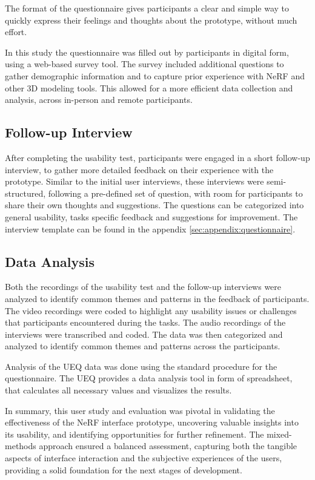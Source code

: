 The format of the questionnaire gives participants a clear and simple way to  quickly express their feelings and thoughts about the prototype, without much effort.

In this study the questionnaire was filled out by participants in digital form, using a web-based survey tool. %
The survey included additional questions to gather demographic information and to capture prior experience with NeRF and other 3D modeling tools.
This allowed for a more efficient data collection and analysis, across in-person and remote participants.

\subsection*{Follow-up Interview}
\label{sec:methodology:study:interview}

After completing the usability test, participants were engaged in a short follow-up interview, to gather more detailed feedback on their experience with the prototype. 
Similar to the initial user interviews, these interviews were semi-structured, following a pre-defined set of question, with room for participants to share their own thoughts and suggestions.
The questions can be categorized into general usability, tasks specific feedback and suggestions for improvement.
The interview template can be found in the appendix \ref{sec:appendix:questionnaire}.


\subsection*{Data Analysis}
\label{sec:methodology:study:analysis}

Both the recordings of the usability test and the follow-up interviews were analyzed to identify common themes and patterns in the feedback of participants.
The video recordings were coded to highlight any usability issues or challenges that participants encountered during the tasks.
The audio recordings of the interviews were transcribed and coded.
The data was then categorized and analyzed to identify common themes and patterns across the participants.

Analysis of the UEQ data was done using the standard procedure for the questionnaire.
The UEQ provides a data analysis tool in form of spreadsheet, that calculates all necessary values and visualizes the results.

In summary, this user study and evaluation was pivotal in validating the effectiveness of the NeRF interface prototype, uncovering valuable insights into its usability, and identifying opportunities for further refinement. 
The mixed-methods approach ensured a balanced assessment, capturing both the tangible aspects of interface interaction and the subjective experiences of the users, providing a solid foundation for the next stages of development.